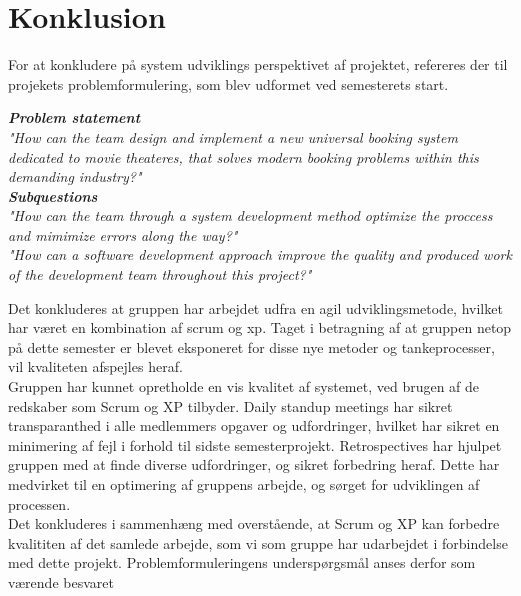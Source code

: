 \chapter{Konklusion}\label{ch:konklusion}
For at konkludere på system udviklings perspektivet af projektet, refereres der til projekets problemformulering,
som blev udformet ved semesterets start.

\begin{center}
\textit{\textbf{Problem statement} \\
"How can the team design and implement a new universal booking system dedicated to movie theateres, 
that solves modern booking problems within this demanding industry?"} \\

\textit{\textbf{Subquestions}\\
"How can the team through a system development method optimize the proccess and mimimize errors along the way?"}\\

\textit{"How can a software development approach improve the quality and 
produced work of the development team throughout this project?"}\\
\end{center} 

Det konkluderes at gruppen har arbejdet udfra en agil udviklingsmetode, hvilket har været en kombination af scrum og xp.
Taget i betragning af at gruppen netop på dette semester er blevet eksponeret for disse nye metoder og tankeprocesser,
vil kvaliteten afspejles heraf. \\

Gruppen har kunnet opretholde en vis kvalitet af systemet, ved brugen af de redskaber som Scrum og XP tilbyder.
Daily standup meetings har sikret transparanthed i alle medlemmers opgaver og udfordringer, hvilket har sikret
en minimering af fejl i forhold til sidste semesterprojekt. 
Retrospectives har hjulpet gruppen med at finde diverse udfordringer, og sikret forbedring heraf. Dette har medvirket
til en optimering af gruppens arbejde, og sørget for udviklingen af processen. \\

Det konkluderes i sammenhæng med overstående, at Scrum og XP kan forbedre kvalititen af det samlede arbejde, 
som vi som gruppe har udarbejdet i forbindelse med dette projekt. Problemformuleringens underspørgsmål anses derfor
som værende besvaret